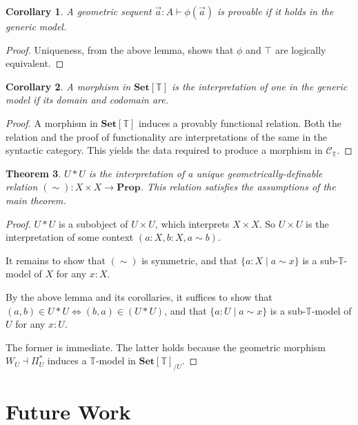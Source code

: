 \documentclass{article}
\newtheorem{theorem}{Theorem}[section]
\newtheorem{corollary}[theorem]{Corollary}
\newcommand*{\Prop}{\mathbf{Prop}}
\newcommand*{\Set}{\mathbf{Set}}
\newcommand*{\C}{\mathcal{C}}
\newcommand*{\T}{\mathbb{T}}
\begin{document}
\begin{corollary}
    A geometric sequent \(\vec{a} : A \vdash \phi(\vec{a})\) is provable if it holds in the generic model.
\end{corollary}

\begin{proof}
    Uniqueness, from the above lemma, shows that \(\phi\) and \(\top\) are logically equivalent.
\end{proof}

\begin{corollary}
    A morphism in \(\Set[\T]\) is the interpretation of one in the generic model if its domain and codomain are.
\end{corollary}

\begin{proof}
    A morphism in \(\Set[\T]\) induces a provably functional relation.
    Both the relation and the proof of functionality are interpretations of the same in the syntactic category.
    This yields the data required to produce a morphism in \(\C_\T\).
\end{proof}

\begin{theorem}
    \(U * U\) is the interpretation of a unique geometrically-definable relation \((\sim) : X \times X \to \Prop\).
    This relation satisfies the assumptions of the main theorem.
\end{theorem}

\begin{proof}
    \(U * U\) is a subobject of \(U \times U\), which interprets \(X \times X\).
    So \(U \times U\) is the interpretation of some context \((a:X,b:X,a\sim b)\).

    It remains to show that \((\sim)\) is symmetric,
    and that \(\{a : X \mid a \sim x\}\) is a sub-\(\T\)-model of \(X\) for any \(x : X\).

    By the above lemma and its corollaries, it suffices to show that \((a,b) \in U*U \Leftrightarrow (b,a) \in (U*U)\),
    and that \(\{a : U \mid a \sim x\}\) is a sub-\(\T\)-model of \(U\) for any \(x : U\).

    The former is immediate. The latter holds because the geometric morphism \(W_U \dashv \Pi^*_U\) induces a \(\T\)-model in \(\Set[\T]_{/U}\).
\end{proof}

\section{Future Work}
\end{document}
